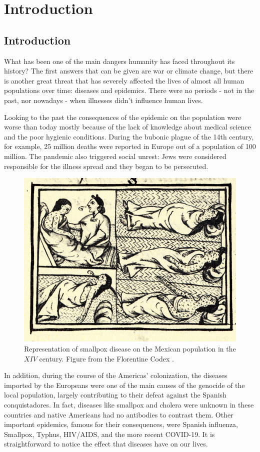 \part{Introduction}

\chapter{Introduction}

What has been one of the main dangers humanity has faced throughout its history? The first answers that can be given are war or climate change, but there is another great threat that has severely affected the lives of almost all human populations over time: diseases and epidemics. There were no periods - not in the past, nor nowadays - when illnesses didn't influence human lives. 

Looking to the past the consequences of the epidemic on the population were worse than today mostly because of the lack of knowledge about medical science and the poor hygienic conditions. During the bubonic plague of the 14th century, for example, 25 million deaths were reported in Europe out of a population of 100 million. The pandemic also triggered social unrest: Jews were considered responsible for the illness spread and they began to be persecuted.

\begin{figure}[]
	\centering
	\includegraphics[width=0.4\linewidth]{0_introduction/images_introduction/FlorentineCodex_smallpox}
	\caption[smallpox on native Americans]{Representation of smallpox disease on the Mexican population in the $XIV$ century. Figure from the Florentine Codex \cite{Sahagun1965}. }
	\label{fig:florentinecodexsmallpox}
\end{figure}

In addition, during the course of the Americas' colonization, the diseases imported by the Europeans were one of the main causes of the genocide of the local population, largely contributing to their defeat against the Spanish conquistadores. In fact, diseases like smallpox and cholera were unknown in these countries and native Americans had no antibodies to contrast them. 
Other important epidemics, famous for their consequences, were Spanish influenza, Smallpox, Typhus, HIV/AIDS, and the more recent COVID-19. 
It is straightforward to notice the effect that diseases have on our lives.

